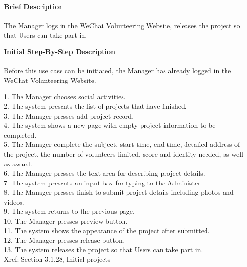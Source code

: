 \documentclass[12pt]{report}
\begin{document}
\paragraph{}
\begin{flushleft}
\textbf{Brief Description }
\paragraph{}
The Manager logs in the WeChat Volunteering Website, releases the project so that Users can take part in. \\

\begin{flushleft}
\textbf{Initial Step-By-Step Description }
\paragraph{}
Before this use case can be initiated, the Manager has already logged in the WeChat Volunteering Website.

\begin{flushleft}
1.	The Manager chooses social activities. \\
2.	The system presents the list of projects that have finished. \\
3.	The Manager presses add project record. \\
4.	The system shows a new page with empty project information to be completed. \\
5.	The Manager complete the subject, start time, end time, detailed address of the project, the number of volunteers limited, score and identity needed, as well as award. \\
6.	The Manager presses the text area for describing project details. \\
7.	The system presents an input box for typing to the Administer. \\
8.	The Manager presses finish to submit project details including photos and videos. \\
9.	The system returns to the previous page.\\
10.	The Manager presses preview button. \\
11.	The system shows the appearance of the project after submitted. \\
12.	The Manager presses release button. \\
13.	The system releases the project so that Users can take part in. \\
Xref: Section 3.1.28, Initial projects

\end{flushleft}
\end{flushleft}
\end{flushleft}
\end{document}
